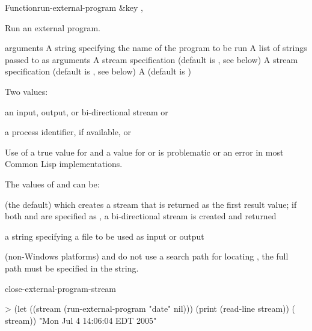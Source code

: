 \documentclass[10pt,twoside,english,pdftex]{article}
\begin{document}
\begin{functiondoc}{Function}{run-external-program}{
  \&key 
  \returns{} , }
%
%

\fnsyntax

\fnpurpose Run an external program.

\fnpackage {}

\fnmodule {}

\fnargs
\begin{args}{arguments}
\arg[program] A string specifying the name of the program to be run
\arg[arguments] A list of strings passed to  as arguments
\arg[input] A stream specification (default is , see below)
\arg[output] A stream specification (default is , see below)
\arg[wait] A  (default is \nil)
\end{args}

\fnreturns Two values:
\begin{tightitemize}
\item an input, output, or bi-directional stream or \nil{}
\item a process identifier, if available, or \nil{}
\end{tightitemize}
  
\fnerrors
Use of a true value for  and a  value for
 or  is problematic or an error in most
Common Lisp implementations.

\fndescription
The values of  and  can be:
\begin{tightitemize}
\item {} (the default) which creates a stream that is
  returned as the first result value; if both  and
   are specified as , a bi-directional
  stream is created and returned
\item a string specifying a file to be used as input or output
\end{tightitemize}

 (non-Windows platforms) and
 do not use a search path for
locating , the full path must be specified in the 
string.

\begin{alsos}{close-external-program-stream}
\end{alsos}

%
\fnexample
\begin{example}
> (let ((stream (run-external-program "date" nil)))
     (print (read-line stream))
     ( stream))
"Mon Jul  4 14:06:04 EDT 2005" 
\end{example}

\end{functiondoc}
\end{document}
